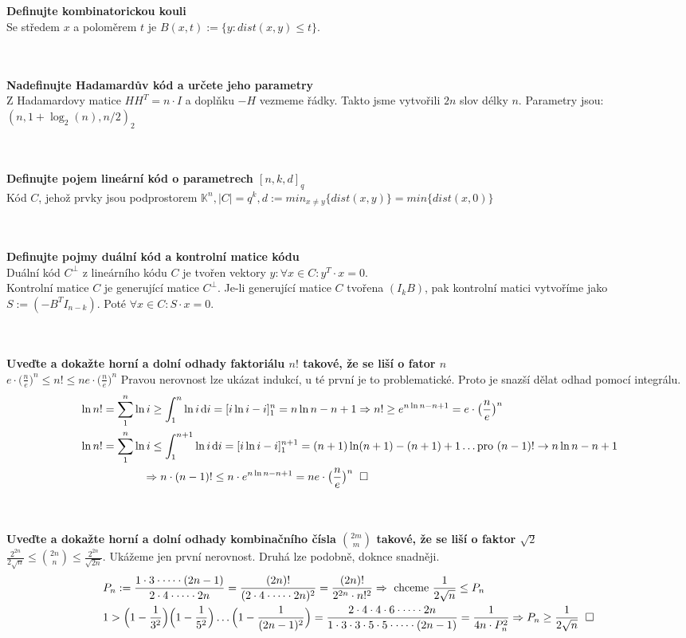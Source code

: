 \documentclass[a4paper]{article}
\newcommand{\qed}{\hspace{0.2cm}\square}
\newcommand{\di}{\hspace{0.05cm}\text{d}i}
\newcommand{\hlava}[1]{\text{} \\ \text{} \\ \text{} \hspace{-0.27cm} \textbf{#1} \\}
\newcommand{\str}[1]{\hspace{0.05cm} \fbox{s. #1} }
\begin{document}
\hlava{Definujte kombinatorickou kouli}
Se středem $x$ a poloměrem $t$ je $B(x,t) := \{y: dist(x,y) \le t\}$. \str{30}

\hlava{Nadefinujte Hadamardův kód a určete jeho parametry}
Z Hadamardovy matice $HH^T = n\cdot I$ a doplňku $-H$ vezmeme řádky. Takto jsme vytvořili $2n$ slov délky $n$. Parametry jsou: $(n, 1+\log_2(n), n/2)_2$ \str{30}

\hlava{Definujte pojem lineární kód o parametrech $[n, k, d]_q$}
Kód $C$, jehož prvky jsou podprostorem $\mathbb{K}^n, |C| = q^k, d := min_{x\ne y}\{dist(x,y)\} = min \{ dist(x,0)\}$

\hlava{Definujte pojmy duální kód a kontrolní matice kódu}
Duální kód $C^\perp$ z lineárního kódu $C$ je tvořen vektory $y: \forall x\in C: y^T \cdot x = 0$. \\
Kontrolní matice $C$ je generující matice $C^\perp$. Je-li generující matice $C$ tvořena $(I_k B)$, pak kontrolní matici vytvoříme jako $S:= (-B^T I_{n-k})$. Poté $\forall x \in C: S\cdot x = 0$. 
\pagebreak

\hlava{Uveďte a dokažte horní a dolní odhady faktoriálu $n!$ takové, že se liší o fator $n$}
$e\cdot \big( \frac{n}{e}\big)^n \le n! \le ne\cdot \big( \frac{n}{e}\big)^n$ Pravou nerovnost lze ukázat indukcí, u té první je to problematické. Proto je snazší dělat odhad pomocí integrálu. \\
\begin{align*}
	 & \ln n! = \sum_1^n \ln i \ge \int_1^n \ln i \di = [i\ln i -i ]_1^n = n\ln n - n + 1 \Rightarrow n! \ge e^{n\ln n - n + 1} = e\cdot \big( \frac{n}{e}\big)^n \\
	 & \ln n! = \sum_1^n \ln i \le \int_1^{n+1} \ln i \di = [i\ln i -i ]_1^{n+1} = (n+1)\ln (n+1) - (n+1) + 1 \dots \text{pro } (n-1)! \rightarrow n \ln n - n + 1 \\
	 & \hspace{2cm}  \Rightarrow n \cdot (n-1)! \le n\cdot e^{n \ln n - n + 1} = n e\cdot \big( \frac{n}{e} \big)^n \qed
\end{align*}

\hlava{Uveďte a dokažte horní a dolní odhady kombinačního čísla ${ 2m \choose m}$ takové, že se liší o faktor $\sqrt{2}$}
$\frac{2^{2n}}{2\sqrt{n}} \le { 2n \choose n} \le \frac{2^{2n}}{\sqrt{2n}}$. Ukážeme jen první nerovnost. Druhá lze podobně, doknce snadněji.
\begin{align*}
	& P_n := \frac{1\cdot 3 \cdot \dots \cdot (2n-1)}{2\cdot 4 \cdot \dots \cdot 2n} =\frac{(2n)!}{(2\cdot 4 \cdot \dots \cdot 2n)^2} = \frac{(2n)!}{2^{2n} \cdot n!^2 } \Rightarrow \text{ chceme } \frac{1}{2\sqrt{n}} \le P_n \\
	& 1 > \Big(1-\frac{1}{3^2} \Big)\Big(1-\frac{1}{5^2} \Big)\dots \Big(1-\frac{1}{(2n-1)^2} \Big) = \frac{2\cdot 4 \cdot 4 \cdot 6 \cdot \dots \cdot 2n}{1 \cdot 3 \cdot 3 \cdot 5 \cdot 5 \cdot \dots \cdot (2n-1)} = \frac{1}{4n \cdot P_n^2} \Rightarrow P_n \ge \frac{1}{2\sqrt{n}} \qed 
\end{align*}
\end{document}
